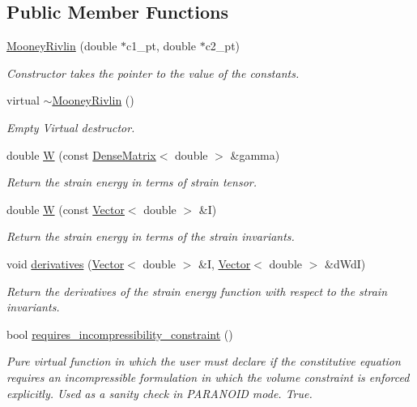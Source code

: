 \subsection*{Public Member Functions}
\begin{DoxyCompactItemize}
\item 
\hyperlink{classoomph_1_1MooneyRivlin_ac67b8747413e5e7cca8f0d4c42b8ecdc}{Mooney\+Rivlin} (double $\ast$c1\+\_\+pt, double $\ast$c2\+\_\+pt)
\begin{DoxyCompactList}\small\item\em Constructor takes the pointer to the value of the constants. \end{DoxyCompactList}\item 
virtual \hyperlink{classoomph_1_1MooneyRivlin_a8ac6843acd4229d6b53af7a06b0d7363}{$\sim$\+Mooney\+Rivlin} ()
\begin{DoxyCompactList}\small\item\em Empty Virtual destructor. \end{DoxyCompactList}\item 
double \hyperlink{classoomph_1_1MooneyRivlin_a9411c5fbb920d071e83a9e52fb8b60d1}{W} (const \hyperlink{classoomph_1_1DenseMatrix}{Dense\+Matrix}$<$ double $>$ \&gamma)
\begin{DoxyCompactList}\small\item\em Return the strain energy in terms of strain tensor. \end{DoxyCompactList}\item 
double \hyperlink{classoomph_1_1MooneyRivlin_aa610beb4e7b06dc3aa57bbc552ca0b80}{W} (const \hyperlink{classoomph_1_1Vector}{Vector}$<$ double $>$ \&I)
\begin{DoxyCompactList}\small\item\em Return the strain energy in terms of the strain invariants. \end{DoxyCompactList}\item 
void \hyperlink{classoomph_1_1MooneyRivlin_a01ff4e87c76813d6a9e528bd896a2bae}{derivatives} (\hyperlink{classoomph_1_1Vector}{Vector}$<$ double $>$ \&I, \hyperlink{classoomph_1_1Vector}{Vector}$<$ double $>$ \&d\+WdI)
\begin{DoxyCompactList}\small\item\em Return the derivatives of the strain energy function with respect to the strain invariants. \end{DoxyCompactList}\item 
bool \hyperlink{classoomph_1_1MooneyRivlin_ad5cd489e1bc8f4cfe1f147135ffe21af}{requires\+\_\+incompressibility\+\_\+constraint} ()
\begin{DoxyCompactList}\small\item\em Pure virtual function in which the user must declare if the constitutive equation requires an incompressible formulation in which the volume constraint is enforced explicitly. Used as a sanity check in P\+A\+R\+A\+N\+O\+ID mode. True. \end{DoxyCompactList}\end{DoxyCompactItemize}
